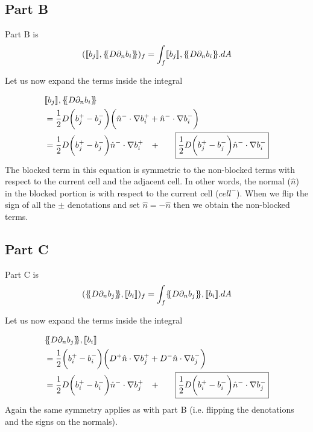 \documentclass[11pt,letterpaper,titlepage]{article}
\newcommand*{\ldblbrace}{\{\mskip-5mu\{}
\newcommand*{\rdblbrace}{\}\mskip-5mu\}}
\numberwithin{equation}{section}
\begin{document}
\vspace{0.5cm}
\subsection{Part B}
Part B is 
\begin{equation*}
(\llbracket b_j \rrbracket,\ldblbrace D \partial_n b_i \rdblbrace)_f  =
\int_f \llbracket b_j \rrbracket,\ldblbrace D \partial_n b_i \rdblbrace .dA
\end{equation*}

Let us now expand the terms inside the integral

\begin{equation*}
\begin{aligned}
 &\llbracket b_j \rrbracket,\ldblbrace D \partial_n b_i \rdblbrace \\
 &= \frac{1}{2}D\biggr(b_j^+ - b_j^-\biggr)\biggr(\hat{n}^-\cdot\nabla b_i^+ + \hat{n}^-\cdot\nabla b_i^-\biggr)\\
 &=\frac{1}{2}D\biggr( b_j^+ - b_j^- \biggr) \hat{n}^-\cdot\nabla b_i^+ \quad
  + \quad \Aboxed{\frac{1}{2}D\biggr( b_j^+ - b_j^- \biggr) \hat{n}^-\cdot\nabla b_i^-} 
\end{aligned}
\end{equation*}
\newline
The blocked term in this equation is symmetric to the non-blocked terms with respect to the current cell and the adjacent cell. In other words, the normal ($\hat{n}$) in the blocked portion is with respect to the current cell ($cell^-$). When we flip the sign of all the $\pm$ denotations and set $\hat{n} = -\hat{n}$ then we obtain the non-blocked terms.

\subsection{Part C}
Part C is
\begin{equation*}
(\ldblbrace D \partial_n b_j \rdblbrace,\llbracket b_i \rrbracket)_f  =
\int_f \ldblbrace D \partial_n b_j \rdblbrace,\llbracket b_i \rrbracket .dA
\end{equation*}

Let us now expand the terms inside the integral

\begin{equation*}
\begin{aligned}
 &\ldblbrace D \partial_n b_j \rdblbrace,\llbracket b_i \rrbracket \\
 &= \frac{1}{2}\biggr(b_i^+ - b_i^-\biggr)\biggr(D^+\hat{n}\cdot\nabla b_j^+ + D^-\hat{n}\cdot\nabla b_j^-\biggr)\\
  &=\frac{1}{2}D\biggr( b_i^+ - b_i^- \biggr) \hat{n}^-\cdot\nabla b_j^+ \quad
   + \quad \Aboxed{\frac{1}{2}D\biggr( b_i^+ - b_i^- \biggr) \hat{n}^-\cdot\nabla b_j^-} 
\end{aligned}
\end{equation*}
\newline
Again the same symmetry applies as with part B (i.e. flipping the denotations and the signs on the normals).
\end{document}
